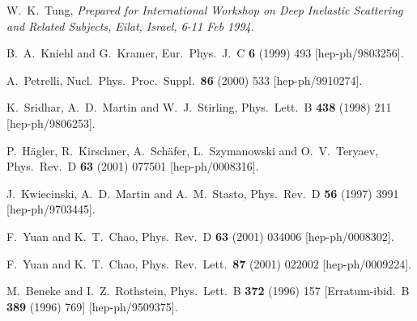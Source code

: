 \begin{thebibliography}{999}
W.~K.~Tung,
{\it Prepared for International Workshop on Deep Inelastic Scattering 
and Related Subjects, Eilat, Israel, 6-11 Feb 1994}.

B.~A.~Kniehl and G.~Kramer,
Eur.\ Phys.\ J.\ C {\bf 6} (1999) 493
[hep-ph/9803256].

A.~Petrelli,
Nucl.\ Phys.\ Proc.\ Suppl.\  {\bf 86} (2000) 533
[hep-ph/9910274].

K.~Sridhar, A.~D.~Martin and W.~J.~Stirling,
Phys.\ Lett.\ B {\bf 438} (1998) 211
[hep-ph/9806253].

P.~H\"agler, R.~Kirschner, A.~Sch\"afer, L.~Szymanowski and O.~V.~Teryaev,
Phys.\ Rev.\ D {\bf 63} (2001) 077501
[hep-ph/0008316].

J.~Kwiecinski, A.~D.~Martin and A.~M.~Stasto,
Phys.\ Rev.\ D {\bf 56} (1997) 3991
[hep-ph/9703445].

F.~Yuan and K.~T.~Chao,
Phys.\ Rev.\ D {\bf 63} (2001) 034006
[hep-ph/0008302].

F.~Yuan and K.~T.~Chao,
Phys.\ Rev.\ Lett.\  {\bf 87} (2001) 022002
[hep-ph/0009224].

M.~Beneke and I.~Z.~Rothstein,
Phys.\ Lett.\ B {\bf 372} (1996) 157
[Erratum-ibid.\ B {\bf 389} (1996) 769]
[hep-ph/9509375].


\end{thebibliography}
